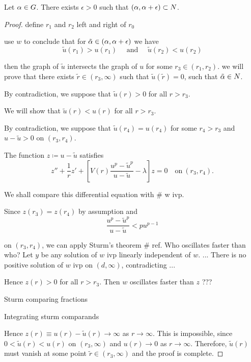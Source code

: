 \begin{lemma}\label{genlem7}
Let $\alpha \in G$. There exists $\epsilon > 0$ such that $(\alpha, \alpha + \epsilon)
\subset N$. 
\end{lemma}
\begin{proof}
define $r_1$ and $r_2$ left and right of $r_0$

use $w$ to conclude that for $\tilde{\alpha} \in (\alpha, \alpha + \epsilon)$ we have
\[
\tilde{u}(r_1) > u(r_1)\quad\text{ and }\quad \tilde{u}(r_2) < u(r_2)
\]

then the graph of $\tilde{u}$ intersects the graph of $u$ for some $r_3 \in
(r_1, r_2)$. we will prove that there exists $\tilde{r} \in (r_3, \infty)$ such
that $\tilde{u}(\tilde{r}) = 0$, such that $\tilde{\alpha} \in N$. 

By contradiction, we suppose that $\tilde{u}(r) > 0$ for all $r > r_3$.

We will show that $\tilde{u}(r) < u(r)$ for all $r > r_3$.

By contradiction, we suppose that $\tilde{u}(r_4) = u(r_4)$ for some $r_4 > r_3$
and $u - \tilde{u} > 0$ on $(r_3, r_4)$.

The function $z \coloneqq u - \tilde{u}$ satisfies
\[ z'' + \frac{1}{r} z' + \left[ V(r) \frac{u^p - \tilde{u}^p}{u - \tilde{u}} 
- \lambda \right] z = 0\quad\text{on}~(r_3, r_4). \]

We shall compare this differential equation with \# w ivp.

Since $z(r_3) = z(r_4)$ by assumption and
\[ \frac{u^p - \tilde{u}^p}{u - \tilde{u}} < pu^{p-1} \]

on $(r_3, r_4)$, we can apply Sturm's theorem \# ref. {\red Who oscillates
faster than who?} Let $y$ be any solution of $w$ ivp linearly independent of
$w$. ... There is no positive solution of $w$ ivp on $(d, \infty)$,
contradicting ...

Hence $z(r) > 0$ for all $r > r_3$. Then $w$ oscillates faster than $z$ ???

Sturm comparing fractions

Integrating sturm comparands

Hence $z(r) \equiv u(r) - \tilde{u}(r) \to \infty$ as $r \to \infty$. This is
impossible, since $0 < \tilde{u}(r) < u(r)$ on $(r_3, \infty)$ and $u(r) \to 0$
as $r \to \infty$. Therefore, $\tilde{u}(r)$ must vanish at some point
$\tilde{r} \in (r_3, \infty)$ and the proof is complete.
 
\end{proof}

